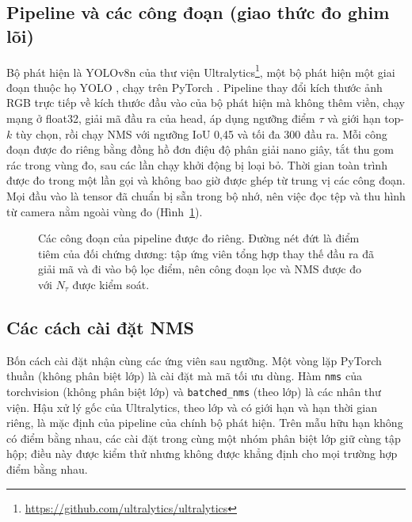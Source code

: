 \documentclass[12pt,a4paper]{article}
\newcommand{\Ntau}{N_{\tau}}
\begin{document}
\subsection{Pipeline và các công đoạn (giao thức đo ghim lõi)}
Bộ phát hiện là YOLOv8n của thư viện Ultralytics\footnote{\url{https://github.com/ultralytics/ultralytics}}, một bộ phát hiện một giai đoạn thuộc họ YOLO \cite{redmon2016yolo}, chạy trên PyTorch \cite{paszke2019pytorch}. Pipeline thay đổi kích thước ảnh RGB trực tiếp về kích thước đầu vào của bộ phát hiện mà không thêm viền, chạy mạng ở float32, giải mã đầu ra của head, áp dụng ngưỡng điểm $\tau$ và giới hạn top-$k$ tùy chọn, rồi chạy NMS với ngưỡng IoU 0,45 và tối đa 300 đầu ra. Mỗi công đoạn được đo riêng bằng đồng hồ đơn điệu độ phân giải nano giây, tắt thu gom rác trong vùng đo, sau các lần chạy khởi động bị loại bỏ. Thời gian toàn trình được đo trong một lần gọi và không bao giờ được ghép từ trung vị các công đoạn. Mọi đầu vào là tensor đã chuẩn bị sẵn trong bộ nhớ, nên việc đọc tệp và thu hình từ camera nằm ngoài vùng đo (Hình~\ref{fig:pipeline}).

\begin{figure}[t]
\centering
{}
\caption{Các công đoạn của pipeline được đo riêng. Đường nét đứt là điểm tiêm của đối chứng dương: tập ứng viên tổng hợp thay thế đầu ra đã giải mã và đi vào bộ lọc điểm, nên công đoạn lọc và NMS được đo với $\Ntau$ được kiểm soát.}
\label{fig:pipeline}
\end{figure}

\subsection{Các cách cài đặt NMS}
Bốn cách cài đặt nhận cùng các ứng viên sau ngưỡng. Một vòng lặp PyTorch thuần (không phân biệt lớp) là cài đặt mà mã tối ưu dùng. Hàm \texttt{nms} của torchvision (không phân biệt lớp) và \texttt{batched\_nms} (theo lớp) là các nhân thư viện. Hậu xử lý gốc của Ultralytics, theo lớp và có giới hạn và hạn thời gian riêng, là mặc định của pipeline của chính bộ phát hiện. Trên mẫu hữu hạn không có điểm bằng nhau, các cài đặt trong cùng một nhóm phân biệt lớp giữ cùng tập hộp; điều này được kiểm thử nhưng không được khẳng định cho mọi trường hợp điểm bằng nhau.
\end{document}
